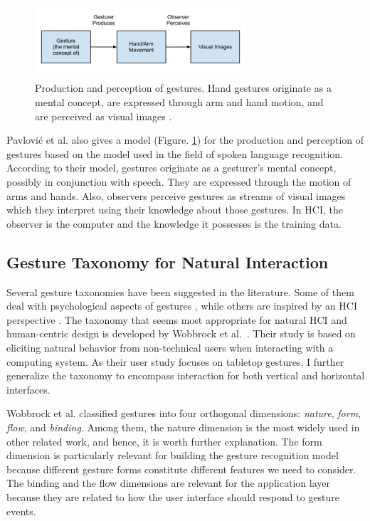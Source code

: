 \begin{figure}[tbh]
  \centering
  \includegraphics[width=0.7\textwidth]{figures/gesture_production.png} 
  \caption{Production and perception of gestures. Hand gestures originate as a
  mental concept, are expressed through arm and hand motion, and are perceived
  as visual images \cite{Pavlovic97}.}
  \label{fig:gesture_production}
\end{figure}

Pavlovi\'{c} et al. \cite{Pavlovic97} also gives a model (Figure. 
\ref{fig:gesture_production}) for the production and perception of gestures 
based on the model used in the field of spoken language recognition. According 
to their model, gestures originate as a gesturer's mental concept, possibly in 
conjunction with speech. They are expressed through the motion of arms and 
hands. Also, observers perceive gestures as streams of visual images which they
interpret using their knowledge about those gestures. In HCI, the 
observer is the computer and the knowledge it possesses is the training data.

\subsection{Gesture Taxonomy for Natural Interaction}\label{sec:taxonomy}
Several gesture taxonomies have been suggested in the literature. Some of them
deal with psychological aspects of gestures \cite{kendon86, mcneill82}, while
others are inspired by an HCI perspective \cite{Pavlovic97, quek95, wobbrock09}. 
The taxonomy that seems most appropriate for natural HCI and human-centric
design is developed by Wobbrock et al.~\cite{wobbrock09}. Their study is based on
eliciting natural behavior from non-technical users when interacting with a computing system.
As their user study focuses on tabletop gestures, I further generalize the
taxonomy to encompass interaction for both vertical and horizontal interfaces.

Wobbrock et al. \cite{wobbrock09} classified gestures into four
orthogonal dimensions: \textit{nature}, \textit{form},
\textit{flow}, and \textit{binding}. Among them, the nature
dimension is the most widely used in other related work, and hence, it is
worth further explanation.
The form dimension is particularly relevant for building the gesture recognition model because
different gesture forms constitute different features we need to consider. The
binding and the flow dimensions are relevant for the application layer because they are related to
how the user interface should respond to gesture events.

